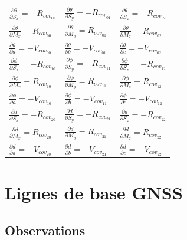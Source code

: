 \documentclass[french]{report}
\begin{document}
\begin{itemize}
\begin{tabular}{lll}
$\frac{\partial{\theta}}{\partial{S_x}} = -R_{{cov}_{00}}$ & $\frac{\partial{\theta}}{\partial{S_y}} = -R_{{cov}_{01}}$ & $\frac{\partial{\theta}}{\partial{S_z}} = -R_{{cov}_{02}}$ \\[0.3cm]
$\frac{\partial{\theta}}{\partial{M_x}} = R_{{cov}_{00}}$ & $\frac{\partial{\theta}}{\partial{M_y}} = R_{{cov}_{01}}$ & $\frac{\partial{\theta}}{\partial{M_z}} = R_{{cov}_{02}}$ \\[0.3cm]
$\frac{\partial{\theta}}{\partial{a}} = -V_{{cov}_{00}}$ & $\frac{\partial{\theta}}{\partial{b}} = - V_{{cov}_{01}}$ & $\frac{\partial{\theta}}{\partial{c}} = -V_{{cov}_{02}}$ \\[0.3cm]
$\frac{\partial{\phi}}{\partial{S_x}} = -R_{{cov}_{10}}$ & $\frac{\partial{\phi}}{\partial{S_y}} = -R_{{cov}_{11}}$ & $\frac{\partial{\phi}}{\partial{S_z}} = -R_{{cov}_{12}}$ \\[0.3cm]
$\frac{\partial{\phi}}{\partial{M_x}} = R_{{cov}_{10}}$ & $\frac{\partial{\phi}}{\partial{M_y}} = R_{{cov}_{11}}$ & $\frac{\partial{\phi}}{\partial{M_z}} = R_{{cov}_{12}}$ \\[0.3cm]
$\frac{\partial{\phi}}{\partial{a}} = -V_{{cov}_{10}}$ & $\frac{\partial{\phi}}{\partial{b}} = - V_{{cov}_{11}}$ & $\frac{\partial{\phi}}{\partial{c}} = -V_{{cov}_{12}}$ \\[0.3cm]
$\frac{\partial{d}}{\partial{S_x}} = -R_{{cov}_{20}}$ & $\frac{\partial{d}}{\partial{S_y}} = -R_{{cov}_{21}}$ & $\frac{\partial{d}}{\partial{S_z}} = -R_{{cov}_{22}}$ \\[0.3cm]
$\frac{\partial{d}}{\partial{M_x}} = R_{{cov}_{20}}$ & $\frac{\partial{d}}{\partial{M_y}} = R_{{cov}_{21}}$ & $\frac{\partial{d}}{\partial{M_z}} = R_{{cov}_{22}}$ \\[0.3cm]
$\frac{\partial{d}}{\partial{a}} = -V_{{cov}_{20}}$ & $\frac{\partial{d}}{\partial{b}} = - V_{{cov}_{21}}$ & $\frac{\partial{d}}{\partial{c}} = -V_{{cov}_{22}}$

\end{tabular}

\end{itemize}




\section{Lignes de base GNSS}\label{lignebase}

\subsection{Observations}
\end{document}
